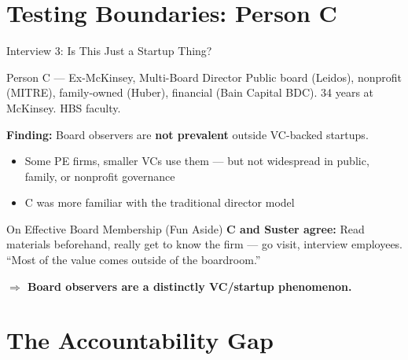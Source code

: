 \documentclass[aspectratio=169,12pt]{beamer}
\begin{document}
\section{Testing Boundaries: Person C}

\begin{frame}{Interview 3: Is This Just a Startup Thing?}
\begin{block}{Person C --- Ex-McKinsey, Multi-Board Director}
\small
Public board (Leidos), nonprofit (MITRE), family-owned (Huber), financial (Bain Capital BDC). 34 years at McKinsey. HBS faculty.
\end{block}
\vspace{0.5em}
\textbf{Finding:} Board observers are \textbf{not prevalent} outside VC-backed startups.
\begin{itemize}
\item Some PE firms, smaller VCs use them --- but not widespread in public, family, or nonprofit governance
\item C was more familiar with the traditional director model
\end{itemize}

\vspace{0.5em}
\begin{exampleblock}{On Effective Board Membership (Fun Aside)}
\small
\textbf{C and Suster agree:} Read materials beforehand, really get to know the firm --- go visit, interview employees. ``Most of the value comes outside of the boardroom.''
\end{exampleblock}

\vspace{0.3em}
\begin{center}
\textbf{$\Rightarrow$ Board observers are a \textcolor{harvardcrimson}{distinctly VC/startup phenomenon}.}
\end{center}
\end{frame}

\section{The Accountability Gap}
\end{document}
